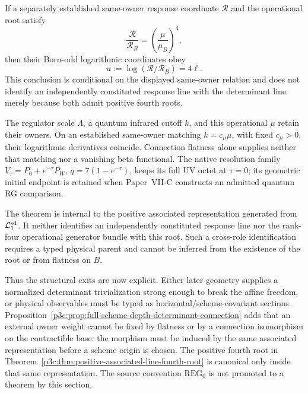\documentclass[12pt,a4paper]{article}
\begin{document}
\begin{corollary}
\label{p3c:cor:weight-four-born-logrelation}
If a separately established same-owner response coordinate $\mathcal R$ and
the operational root satisfy
\[
 \frac{\mathcal R}{\mathcal R_B}
 =\left(\frac{\mu}{\mu_B}\right)^4,
\]
then their Born-odd logarithmic coordinates obey
\[
 \boxed{u:=\log(\mathcal R/\mathcal R_B)=4\ell}.
\]
This conclusion is conditional on the displayed same-owner relation and does
not identify an independently constituted response line with the determinant
line merely because both admit positive fourth roots.
\end{corollary}

The regulator scale \(\Lambda\), a quantum infrared cutoff \(k\), and this
operational \(\mu\) retain their owners.  On an established same-owner
matching \(k=c_\mu\mu\), with fixed \(c_\mu>0\), their logarithmic
derivatives coincide.  Connection flatness alone supplies neither that
matching nor a vanishing beta functional.  The native resolution family
\(V_\tau=P_0+e^{-\tau}P_W\), \(q=7(1-e^{-\tau})\), keeps its full UV
octet at \(\tau=0\); its geometric initial endpoint is retained when
Paper~VII-C constructs an admitted quantum RG comparison.


\begin{remark}
\label{p3c:rem:fourth-root-same-representation-firewall}
The theorem is internal to the positive associated representation generated
from \(\mathcal L^{\rm sd}_1\).  It neither identifies an independently
constituted response line nor the rank-four operational generator bundle with
this root.  Such a cross-role identification requires a typed physical parent
and cannot be inferred from the existence of the root or from flatness on
\(B\).
\end{remark}

Thus the structural exits are now explicit.  Either later geometry supplies a
normalized determinant trivialization strong enough to break the affine
freedom, or physical observables must be typed as horizontal/scheme-covariant
sections.  Proposition~\ref{p3c:prop:full-scheme-depth-determinant-connection}
adds that an external owner weight cannot be fixed by flatness or by a
connection isomorphism on the contractible base: the morphism must be induced
by the same associated representation before a scheme origin is chosen.  The
positive fourth root in
Theorem~\ref{p3c:thm:positive-associated-line-fourth-root} is canonical only
inside that same representation.  The source convention
$\mathrm{REG}_0$ is not promoted to a theorem by this section.
\end{document}
